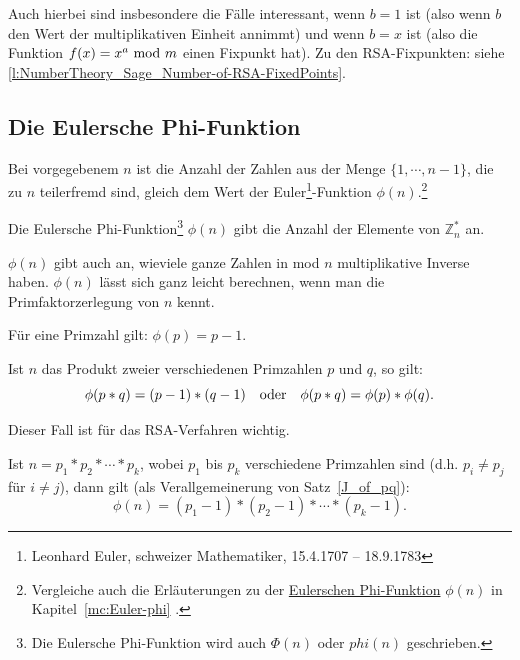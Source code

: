 \begin{refsegment}
Auch hierbei sind insbesondere die Fälle interessant, wenn $b=1$ ist
(also wenn $b$ den Wert der multiplikativen Einheit annimmt) und wenn $b=x$ ist
(also die Funktion $ f(x) = x^{a} {\rm ~mod~} m$ einen Fixpunkt hat).
Zu den RSA-Fixpunkten: siehe \ref{l:NumberTheory_Sage_Number-of-RSA-FixedPoints}.


\subsection{Die Eulersche Phi-Funktion}
\label{L-Euler-Function}

Bei vorgegebenem $n$ ist die Anzahl der Zahlen aus der Menge $\{1, \cdots,
n-1\}$, die zu $n$ teilerfremd sind,
gleich dem Wert der Euler\footnote{%
  Leonhard Euler, schweizer Mathematiker, 15.4.1707 -- 18.9.1783
}-Funktion $\phi(n)$.\footnote{%
  Vergleiche auch die Erläuterungen zu der \hyperlink{mc:Euler-phi}{Eulerschen Phi-Funktion}
  $\phi(n)$ in Kapitel~\ref{mc:Euler-phi} \glqq {}\grqq.
}

\begin{definition}\label{def-zth-phiofn} \hypertarget{EulerFunction}{}
  Die Eulersche Phi-Funktion\footnote{%
    Die Eulersche Phi-Funktion wird auch
    $\Phi(n)$ oder $phi(n)$ geschrieben.
  }
  $\phi(n)$ gibt die Anzahl der Elemente von $\mathbb{Z}_n^*$ an.
\end{definition}

$\phi(n)$ gibt auch an, wieviele ganze Zahlen in mod $n$ multiplikative Inverse
haben. $\phi(n)$ lässt sich ganz leicht berechnen, wenn man die Primfaktorzerlegung
 von $n$ kennt.

\begin{satz}\label{thm-zth-phiprime}
Für eine Primzahl gilt: $\phi(p) = p - 1.$
\end{satz}

\begin{satz}\label{thm-zth-phipq} \label{J_of_pq}
Ist $n$ das Produkt zweier verschiedenen Primzahlen $p$ und $q$, so gilt:
$$\phi(p*q) = (p - 1) * (q - 1) \quad {\rm oder} \quad \phi(p * q) = \phi(p) * \phi(q).$$
\end{satz}
Dieser Fall ist für das RSA-Verfahren wichtig.

\begin{satz}\label{thm-zth-phimultprime} \label{J_of_p1..pk}
Ist $n = p_1 * p_2 * \cdots * p_k$, wobei $p_1$ bis $p_k$ verschiedene
Primzahlen sind (d.h. $p_i \not= p_j$ für $i \not= j$), dann gilt (als
Verallgemeinerung von Satz~\ref{J_of_pq}):
$$\phi(n) = (p_1 - 1)*(p_2 - 1)* \cdots *(p_k - 1).$$
\end{satz}



\end{refsegment}
